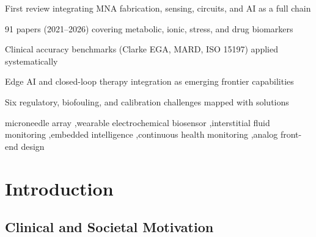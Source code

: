 \documentclass[review,1p]{elsarticle}
\begin{document}
\begin{frontmatter}
\begin{abstract}
We identify six systematic gaps in existing reviews — including the absence of clinical accuracy methodology, multi-analyte multiplexed architectures, exercise physiology validation, and regulatory pathway analysis — and demonstrate how full-chain integration addresses these gaps. This review provides a comprehensive reference for researchers and engineers designing next-generation wearable biosensing devices.
\end{abstract}

\begin{highlights}
\item First review integrating MNA fabrication, sensing, circuits, and AI as a full chain
\item 91 papers (2021--2026) covering metabolic, ionic, stress, and drug biomarkers
\item Clinical accuracy benchmarks (Clarke EGA, MARD, ISO 15197) applied systematically
\item Edge AI and closed-loop therapy integration as emerging frontier capabilities
\item Six regulatory, biofouling, and calibration challenges mapped with solutions
\end{highlights}

\begin{keyword}
microneedle array \sep wearable electrochemical biosensor \sep interstitial fluid monitoring \sep embedded intelligence \sep continuous health monitoring \sep analog front-end design
\end{keyword}

\end{frontmatter}

\linenumbers

\section{Introduction}
\label{sec:intro}

\subsection{Clinical and Societal Motivation}
\label{subsec:motivation}
\end{document}
